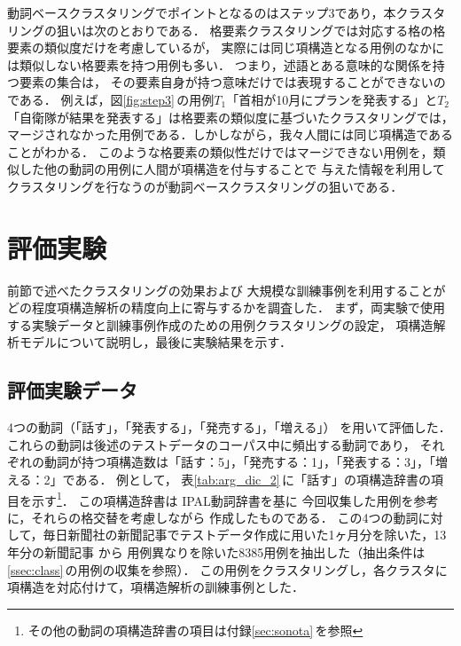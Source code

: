 動詞ベースクラスタリングでポイントとなるのはステップ3であり，本クラスタリングの狙いは次のとおりである．
格要素クラスタリングでは対応する格の格要素の類似度だけを考慮しているが，
実際には同じ項構造となる用例のなかには類似しない格要素を持つ用例も多い．
つまり，述語とある意味的な関係を持つ要素の集合は，
その要素自身が持つ意味だけでは表現することができないのである．
例えば，図\ref{fig:step3}\,の用例$T_{1}$「首相が10月にプランを発表する」と$T_{2}$「自衛隊が結果を発表する」は格要素の類似度に基づいたクラスタリングでは，
マージされなかった用例である．しかしながら，我々人間には同じ項構造であることがわかる．
このような格要素の類似性だけではマージできない用例を，類似した他の動詞の用例に人間が項構造を付与することで
与えた情報を利用してクラスタリングを行なうのが動詞ベースクラスタリングの狙いである．







\section{評価実験}
\label{sec:fourth}

前節で述べたクラスタリングの効果および
大規模な訓練事例を利用することがどの程度項構造解析の精度向上に寄与するかを調査した．
まず，両実験で使用する実験データと訓練事例作成のための用例クラスタリングの設定，
項構造解析モデルについて説明し，最後に実験結果を示す．

\subsection{評価実験データ}
\label{ssec:data}

4つの動詞（「話す」，「発表する」，「発売する」，「増える」）
を用いて評価した．
これらの動詞は後述のテストデータのコーパス中に頻出する動詞であり，
それぞれの動詞が持つ項構造数は「話す：5」，「発売する：1」，「発表する：3」，「増える：2」である．
例として，
表\ref{tab:arg_dic_2}\,に「話す」の項構造辞書の項目を示す\footnote{その他の動詞の項構造辞書の項目は付録\ref{sec:sonota}\,を参照}．
この項構造辞書は
IPAL動詞辞書\cite{IPAL}を基に
今回収集した用例を参考に，それらの格交替を考慮しながら
作成したものである．
この4つの動詞に対して，毎日新聞社の新聞記事でテストデータ作成に用いた1ヶ月分を除いた，13年分の新聞記事
から
用例異なりを除いた8385用例を抽出した（抽出条件は\ref{ssec:class}\,の用例の収集を参照）．
この用例をクラスタリングし，各クラスタに項構造を対応付けて，項構造解析の訓練事例とした．


